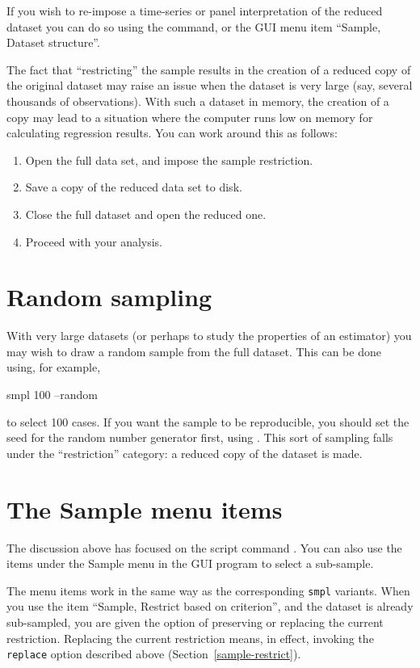 If you wish to re-impose a time-series or panel interpretation of the
reduced dataset you can do so using the  command, or the
GUI menu item ``Sample, Dataset structure''.

The fact that ``restricting'' the sample results in the creation of a
reduced copy of the original dataset may raise an issue when the
dataset is very large (say, several thousands of observations).  With
such a dataset in memory, the creation of a copy may lead to a
situation where the computer runs low on memory for calculating
regression results.  You can work around this as follows:

\begin{enumerate}
\item Open the full data set, and impose the sample restriction.
\item Save a copy of the reduced data set to disk.
\item Close the full dataset and open the reduced one.
\item Proceed with your analysis.
\end{enumerate}

\section{Random sampling}
\label{sample-random}

With very large datasets (or perhaps to study the properties of an
estimator) you may wish to draw a random sample from the full dataset.
This can be done using, for example,
%
\begin{code}
    smpl 100 --random
\end{code}
%
to select 100 cases.  If you want the sample to be reproducible, you
should set the seed for the random number generator first, using
.  This sort of sampling falls under the ``restriction''
category: a reduced copy of the dataset is made.

\section{The Sample menu items}
\label{sample-menu}

The discussion above has focused on the script command . You
can also use the items under the \textsf{Sample} menu in the GUI
program to select a sub-sample.

The menu items work in the same way as the corresponding \verb+smpl+
variants.  When you use the item ``Sample, Restrict based on
criterion'', and the dataset is already sub-sampled, you are given the
option of preserving or replacing the current restriction.  Replacing
the current restriction means, in effect, invoking the \verb+replace+
option described above (Section~\ref{sample-restrict}).
    

